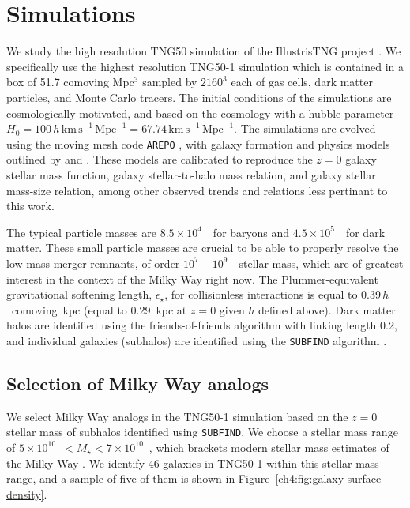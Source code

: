 \section{Simulations}
\label{ch4:sec:simulations}

We study the high resolution TNG50 simulation \parencite{tng50_nelson19,tng50_pillepich19} of the IllustrisTNG project \parencite{tng_public_release_nelson19}. We specifically use the highest resolution TNG50-1 simulation which is contained in a box of 51.7 comoving Mpc$^{3}$ sampled by $2160^{3}$ each of gas cells, dark matter particles, and Monte Carlo tracers. The initial conditions of the simulations are cosmologically motivated, and based on the \textcite{planck15} cosmology with a hubble parameter $H_{0} = 100\,h\,\mathrm{km\,s}^{-1}\,\mathrm{Mpc}^{-1} = 67.74 \,\mathrm{km\,s}^{-1}\,\mathrm{Mpc}^{-1} $. The simulations are evolved using the moving mesh code \texttt{AREPO} \parencite{arepo_springel10}, with galaxy formation and physics models outlined by \textcite{tng_model_weinberger17} and \textcite{tng_model_pillepich18}. These models are calibrated to reproduce the $z=0$ galaxy stellar mass function, galaxy stellar-to-halo mass relation, and galaxy stellar mass-size relation, among other observed trends and relations less pertinant to this work.

The typical particle masses are $8.5 \times 10^{4}$~\Msun\ for baryons and $4.5\times10^{5}$~\Msun\ for dark matter. These small particle masses are crucial to be able to properly resolve the low-mass merger remnants, of order $10^{7}-10^{9}$~\Msun\ stellar mass, which are of greatest interest in the context of the Milky Way right now. The Plummer-equivalent gravitational softening length, $\epsilon_{\star}$, for collisionless interactions is equal to 0.39\,$h$~comoving~kpc (equal to 0.29~kpc at $z=0$ given $h$ defined above). Dark matter halos are identified using the friends-of-friends algorithm with linking length 0.2, and individual galaxies (subhalos) are identified using the \texttt{SUBFIND} algorithm \parencite{subfind_springel01}.

\subsection{Selection of Milky Way analogs}
\label{ch4:subsec:analog-selection}

We select Milky Way analogs in the TNG50-1 simulation based on the $z=0$ stellar mass of subhalos identified using \texttt{SUBFIND}. We choose a stellar mass range of $5\times10^{10}$~\Msun $< M_{\star} < 7 \times 10^{10}$~\Msun, which brackets modern stellar mass estimates of the Milky Way \parencite[e.g. see][]{bland-hawthorn16}. We identify 46 galaxies in TNG50-1 within this stellar mass range, and a sample of five of them is shown in Figure~\ref{ch4:fig:galaxy-surface-density}.

